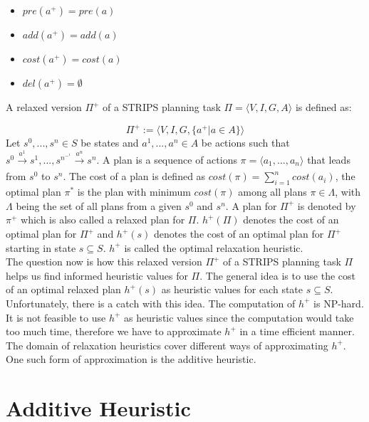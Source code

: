 \begin{itemize}
\setlength\itemsep{0em}
\item $pre(a^+) = pre(a)$
\item $add(a^+) = add(a)$
\item $cost(a^+) = cost(a)$ 
\item $del(a^+) = \emptyset$
\end{itemize}

 

A relaxed version $\Pi^+$ of a STRIPS planning task $\Pi = \langle V, I, G, A \rangle$ is defined as: 

\begin{equation*}
    \Pi^+ := \langle V, I, G, \{a^+|a \in A\} \rangle
\end{equation*}
\newpage
Let $s^0,...,s^n \in S$ be states and $a^1,...,a^n \in A$ be actions such that $s^0\xrightarrow[\text{}]{a^1} s^1,...,s^n^-^1\xrightarrow[\text{}]{a^n} s^n$. A plan is a sequence of actions $\pi = \langle a_1 ,$...$, a_n \rangle$ that leads from $s^0$ to $s^n$. The cost of a plan is defined as $cost(\pi) = \sum_{i = 1}^{n} cost(a_i)$, the optimal plan $\pi^*$ is the plan with minimum $cost(\pi)$ among all plans $\pi \in \Lambda$, with $\Lambda$ being the set of all plans from a given $s^0$ and $s^n$. A plan for $\Pi^+$ is denoted by $\pi^+$ which is also called a relaxed plan for $\Pi$. $h^+(\Pi)$ denotes the cost of an optimal plan for $\Pi^+$ and $h^+(s)$ denotes the cost of an optimal plan for $\Pi^+$ starting in state $s \subseteq S$. $h^+$ is called the optimal relaxation heuristic.\\

 

The question now is how this relaxed version $\Pi^+$ of a STRIPS planning task $\Pi$ helps us find informed heuristic values for $\Pi$. The general idea is to use the cost of an optimal relaxed plan $h^+(s)$ as heuristic values for each state $s \subseteq S$. Unfortunately, there is a catch with this idea. The computation of $h^+$ is NP-hard. It is not feasible to use $h^+$ as heuristic values since the computation would take too much time, therefore we have to approximate $h^+$ in a time efficient manner. The domain of relaxation heuristics cover different ways of approximating $h^+$. One such form of approximation is the additive heuristic. 


\section{Additive Heuristic}

